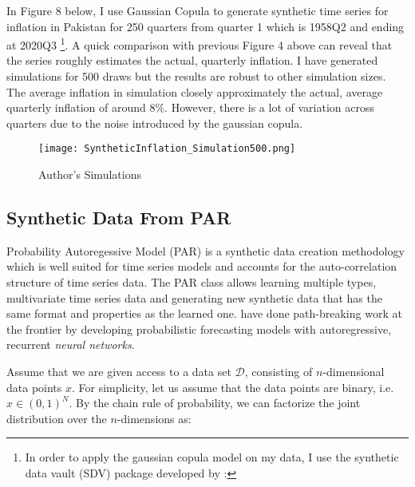\documentclass[12pt]{article}
\newcommand{\1}{\mathbbm 1}
\begin{document}
		
		
		In Figure 8 below, I use Gaussian Copula to generate synthetic time series for inflation in Pakistan for 250 quarters from quarter 1 which is 1958Q2 and ending at 2020Q3 \footnote{In order to apply the gaussian copula model on my data, I use the synthetic data vault (SDV) package developed by \cite{patki2016synthetic}: {\color{blue}{https://sdv.dev/}}}. A quick comparison with previous Figure 4 above can reveal that the series roughly estimates the actual, quarterly inflation. I have generated simulations for 500 draws but the results are robust to other simulation sizes. The average inflation in simulation closely approximately the actual, average quarterly inflation of around 8\%. However, there is a lot of variation across quarters due to the noise introduced by the gaussian copula.
		
		
		
		
		
		
		
		\begin{figure}[H]
			\begin{Center}
				\texttt{[image: SyntheticInflation\_Simulation500.png]}
				\caption{Author's Simulations}
			\end{Center}
		\end{figure}
		
		\subsection{Synthetic Data From PAR}
		
		Probability Autoregessive Model (PAR) is a synthetic data creation methodology which is well suited for time series models and accounts for the auto-correlation structure of time series data. The PAR class allows learning multiple types, multivariate time series data and generating new synthetic data that has the same format and properties as the learned one. \cite{salinas2020deepar} have done path-breaking work at the frontier by developing probabilistic forecasting models with autoregressive, recurrent \textit{neural networks}.
		
	    Assume that we are given access to a data set $\mathcal{D}$, consisting of $n$-dimensional data points $x$. For simplicity, let us assume that the data points are binary, i.e. $x \in (0, 1)^{N}$. By the chain rule of probability, we can factorize the joint distribution over the $n$-dimensions as:
	    
\end{document}
